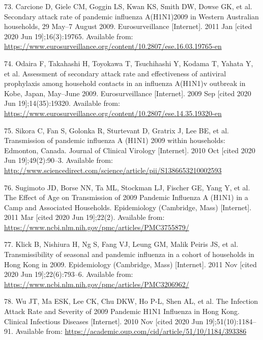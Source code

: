 \documentclass[
]{article}
\begin{document}
\leavevmode\hypertarget{ref-carcione_secondary_2011}{}%
73. Carcione D, Giele CM, Goggin LS, Kwan KS, Smith DW, Dowse GK, et al.
Secondary attack rate of pandemic influenza A(H1N1)2009 in Western
Australian households, 29 May--7 August 2009. Eurosurveillance
{[}Internet{]}. 2011 Jan {[}cited 2020 Jun 19{]};16(3):19765. Available
from:
\url{https://www.eurosurveillance.org/content/10.2807/ese.16.03.19765-en}

\leavevmode\hypertarget{ref-odaira_assessment_2009}{}%
74. Odaira F, Takahashi H, Toyokawa T, Tsuchihashi Y, Kodama T, Yahata
Y, et al. Assessment of secondary attack rate and effectiveness of
antiviral prophylaxis among household contacts in an influenza A(H1N1)v
outbreak in Kobe, Japan, May--June 2009. Eurosurveillance
{[}Internet{]}. 2009 Sep {[}cited 2020 Jun 19{]};14(35):19320. Available
from:
\url{https://www.eurosurveillance.org/content/10.2807/ese.14.35.19320-en}

\leavevmode\hypertarget{ref-sikora_transmission_2010}{}%
75. Sikora C, Fan S, Golonka R, Sturtevant D, Gratrix J, Lee BE, et al.
Transmission of pandemic influenza A (H1N1) 2009 within households:
Edmonton, Canada. Journal of Clinical Virology {[}Internet{]}. 2010 Oct
{[}cited 2020 Jun 19{]};49(2):90--3. Available from:
\url{http://www.sciencedirect.com/science/article/pii/S1386653210002593}

\leavevmode\hypertarget{ref-sugimoto_effect_2011}{}%
76. Sugimoto JD, Borse NN, Ta ML, Stockman LJ, Fischer GE, Yang Y, et
al. The Effect of Age on Transmission of 2009 Pandemic Influenza A
(H1N1) in a Camp and Associated Households. Epidemiology (Cambridge,
Mass) {[}Internet{]}. 2011 Mar {[}cited 2020 Jun 19{]};22(2). Available
from: \url{https://www.ncbi.nlm.nih.gov/pmc/articles/PMC3755879/}

\leavevmode\hypertarget{ref-klick_transmissibility_2011}{}%
77. Klick B, Nishiura H, Ng S, Fang VJ, Leung GM, Malik Peiris JS, et
al. Transmissibility of seasonal and pandemic influenza in a cohort of
households in Hong Kong in 2009. Epidemiology (Cambridge, Mass)
{[}Internet{]}. 2011 Nov {[}cited 2020 Jun 19{]};22(6):793--6. Available
from: \url{https://www.ncbi.nlm.nih.gov/pmc/articles/PMC3206962/}

\leavevmode\hypertarget{ref-wu_infection_2010}{}%
78. Wu JT, Ma ESK, Lee CK, Chu DKW, Ho P-L, Shen AL, et al. The
Infection Attack Rate and Severity of 2009 Pandemic H1N1 Influenza in
Hong Kong. Clinical Infectious Diseases {[}Internet{]}. 2010 Nov
{[}cited 2020 Jun 19{]};51(10):1184--91. Available from:
\url{https://academic.oup.com/cid/article/51/10/1184/393386}
\end{document}
